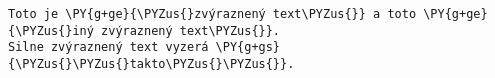 \begin{Verbatim}[commandchars=\\\{\}]
Toto je \PY{g+ge}{\PYZus{}zvýraznený text\PYZus{}} a toto \PY{g+ge}{\PYZus{}iný zvýraznený text\PYZus{}}.
Silne zvýraznený text vyzerá \PY{g+gs}{\PYZus{}\PYZus{}takto\PYZus{}\PYZus{}}.
\end{Verbatim}
